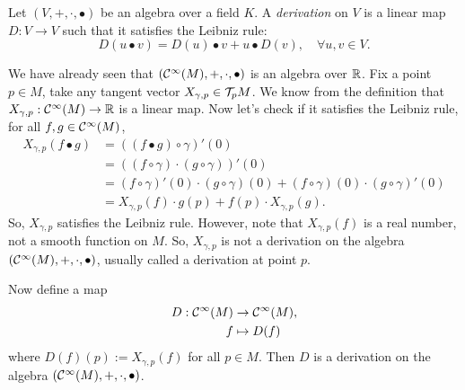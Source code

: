 \begin{definition}[Derivation]
    Let \((V, +, \cdot, \bullet)\) be an algebra over a field \(K\). A \emph{derivation} on \(V\) is a linear map \(D: V \to V\) such that it satisfies the Leibniz rule:
    \begin{equation}
        D(u \bullet v) = D(u) \bullet v + u \bullet D(v), \quad \forall u, v \in V.
    \end{equation}
\end{definition}
\begin{example}
    We have already seen that \((\mathcal C^\infty(M), +, \cdot, \bullet)\) is an algebra over \(\mathbb R\). Fix a point \(p \in M\), take any tangent vector \(X_{\gamma, p} \in \mathcal T_p M\). We know from the definition that \(X_{\gamma, p}: \mathcal C^\infty(M) \to \mathbb R\) is a linear map. Now let's check if it satisfies the Leibniz rule, for all \(f, g \in \mathcal C^\infty(M)\),
    \begin{align*}
        X_{\gamma, p}(f \bullet g) & = ((f \bullet g) \circ \gamma)'(0)                                                                \\
                                   & = ((f \circ \gamma) \cdot (g \circ \gamma))'(0)                                                   \\
                                   & = (f \circ \gamma)'(0) \cdot (g \circ \gamma)(0) + (f \circ \gamma)(0) \cdot (g \circ \gamma)'(0) \\
                                   & = X_{\gamma, p}(f) \cdot g(p) + f(p) \cdot X_{\gamma, p}(g).
    \end{align*}
    So, \(X_{\gamma, p}\) satisfies the Leibniz rule. However, note that \(X_{\gamma, p}(f)\) is a real number, not a smooth function on \(M\). So, \(X_{\gamma, p}\) is not a derivation on the algebra \((\mathcal C^\infty(M), +, \cdot, \bullet)\), usually called a derivation at point \(p\).

    Now define a map
    \begin{equation}
        \begin{aligned}
            D: \mathcal C^\infty(M) & \to \mathcal C^\infty(M), \\
            f                & \mapsto D(f)
        \end{aligned}
    \end{equation}
    where \(D(f)(p) := X_{\gamma, p}(f)\) for all \(p \in M\). Then \(D\) is a derivation on the algebra \((\mathcal C^\infty(M), +, \cdot, \bullet)\).
\end{example}

